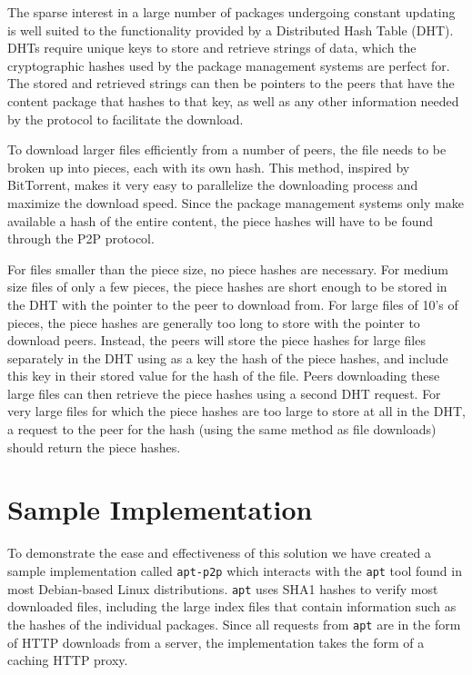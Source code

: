 \documentclass[conference]{IEEEtran}
\begin{document}
The sparse interest in a large
number of packages undergoing constant updating is well suited to
the functionality provided by a Distributed Hash Table (DHT). DHTs
require unique keys to store and retrieve strings of data, which the
cryptographic hashes used by the package management systems are
perfect for. The stored and retrieved strings can then be pointers
to the peers that have the content package that hashes to that key,
as well as any other information needed by the protocol to facilitate
the download.

To download larger files efficiently from a number of peers,
the file needs to be broken up into pieces, each with its own hash.
This method, inspired by BitTorrent, makes it very easy to
parallelize the downloading process and maximize the download speed.
Since the package management systems only make
available a hash of the entire content, the piece hashes will have
to be found through the P2P protocol.

For files smaller than the piece size, no piece hashes are
necessary. For medium size files of only a few pieces, the piece
hashes are short enough to be stored in the DHT with the pointer to
the peer to download from. For large files of 10's of pieces, the
piece hashes are generally too long to store with the pointer to
download peers. Instead, the peers will store the piece hashes for
large files separately in the DHT using as a key the hash of the
piece hashes, and include this key in their stored value for the
hash of the file. Peers downloading these large files can then
retrieve the piece hashes using a second DHT request. For very large
files for which the piece hashes are too large to store at all in
the DHT, a request to the peer for the hash (using the same method
as file downloads) should return the piece hashes.

\section{Sample Implementation}

To demonstrate the ease and effectiveness of this solution we have
created a sample implementation called \texttt{apt-p2p} which
interacts with the \texttt{apt} tool found in most Debian-based
Linux distributions. \texttt{apt} uses SHA1 hashes to verify most
downloaded files, including the large index files that contain
information such as the hashes of the individual packages. Since all
requests from \texttt{apt} are in the form of HTTP downloads from a
server, the implementation takes the form of a caching HTTP proxy.
\end{document}
